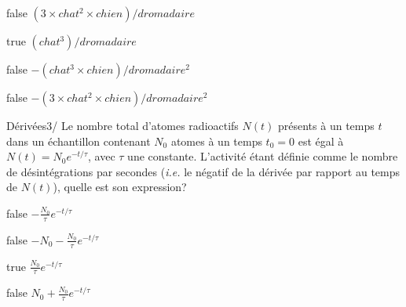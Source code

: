             \begin{reponses}
                \item[false] $(3 \times chat^2 \times chien)/dromadaire$
                \item[true] $(chat^3)/dromadaire$
                \item[false] $-(chat^3\times chien)/dromadaire^2$
                \item[false] $-(3 \times chat^2 \times chien)/dromadaire^2$
            \end{reponses}
            \begin{question}{22}{Dérivées}{3}{/}
                Le nombre total d'atomes radioactifs $N(t)$ présents à un temps $t$ dans un échantillon contenant $N_0$ atomes à un temps $t_0=0$ est égal à $N(t)=N_0e^{-t/\tau}$, avec $\tau$ une constante. L'activité étant définie comme le nombre de désintégrations par secondes (\textit{i.e.} le négatif de la dérivée par rapport au temps de $N(t)$), quelle est son expression?
            \end{question}
            \begin{reponses}
                \item[false] $-\frac{N_0}{\tau}e^{-t/\tau}$
                \item[false] $-N_0-\frac{N_0}{\tau}e^{-t/\tau}$
                \item[true] $\frac{N_0}{\tau}e^{-t/\tau}$
                \item[false] $N_0+\frac{N_0}{\tau}e^{-t/\tau}$
            \end{reponses}
